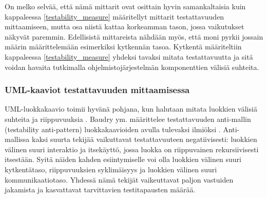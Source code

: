 \documentclass[finnish]{tktltiki2}
\numberwithin{table}{section}
\theoremstyle{definition}
\theoremstyle{remark}
\begin{document}
\begin{table}[H]
	\centering
	\setlength{\extrarowheight}{4pt}%
\end{table}


\noindent
On melko selvää, että nämä mittarit ovat osittain hyvin samankaltaisia kuin kappaleessa \ref{testability_measure} määritellyt mittarit testattavuuden mittaamiseen, mutta osa niistä kattaa korkeamman tason, jossa vaikutukset näkyvät paremmin. Edellisistä mittareista nähdään myös, että moni pyrkii jossain määrin määrittelemään esimerkiksi kytkennän tasoa. Kytkentä määriteltiin kappaleessa \ref{testability_measure} yhdeksi tavaksi mitata testattavuutta ja sitä voidan havaita tutkimalla ohjelmistojärjestelmän komponenttien välisiä suhteita.

\subsubsection{UML-kaaviot testattavuuden mittaamisessa} \label{uml_arch_test}

UML-luokkakaavio toimii hyvänä pohjana, kun halutaan mitata luokkien välisiä suhteita ja riippuvuuksia \citep{baudry_testability_2002}. 
Baudry ym. määrittelee testattavuuden anti-mallin (testability anti-pattern) luokkakaavioiden avulla tulevaksi ilmiöksi \citep{baudry_measuring_2003}. Anti-mallissa kaksi suurta tekijää vaikuttavat testattavuuteen negatiivisesti: luokkien välinen suuri interaktio ja itsekäyttö, jossa luokka on riippuvainen rekursiivisesti itsestään. Syitä näiden kahden esiintymiselle voi olla luokkien välinen suuri kytkentätaso, riippuvuuksien syklimäisyys ja luokkien välinen suuri kommunikaatiotaso. Yhdessä nämä tekijät vaikeuttavat paljon vastuiden jakamista ja kasvattavat tarvittavien testitapausten määrää. 
\end{document}
